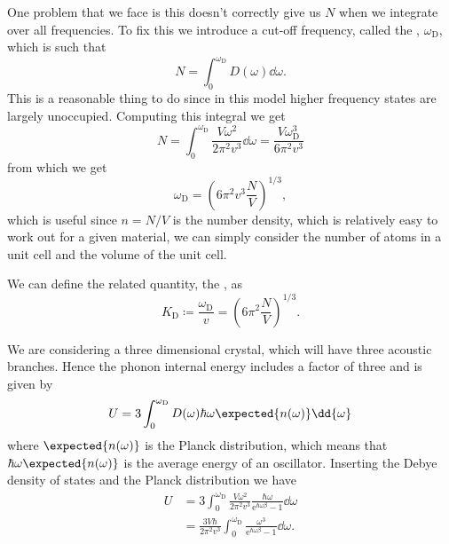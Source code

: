 \documentclass[fleqn]{NotesClass}
\newcommand*{\e}{\mathrm{e}}
\newcommand*{\debye}{\mathrm{D}}
\begin{document}
    One problem that we face is this doesn't correctly give us \(N\) when we integrate over all frequencies.
    To fix this we introduce a cut-off frequency, called the , \(\omega_{\debye}\), which is such that
    \begin{equation}
        N = \int_0^{\omega_{\debye}} D(\omega) \dd{\omega}.
    \end{equation}
    This is a reasonable thing to do since in this model higher frequency states are largely unoccupied.
    Computing this integral we get
    \begin{equation}
        N = \int_{0}^{\omega_{\debye}} \frac{V\omega^2}{2\pi^2v^3} \dd{\omega} = \frac{V\omega_{\debye}^{3}}{6\pi^2v^3}
    \end{equation}
    from which we get
    \begin{equation}
        \omega_{\debye} = \left(6\pi^2v^3 \frac{N}{V}\right)^{1/3},
    \end{equation}
    which is useful since \(n = N/V\) is the number density, which is relatively easy to work out for a given material, we can simply consider the number of atoms in a unit cell and the volume of the unit cell.
    
    We can define the related quantity, the , as
    \begin{equation}
        K_{\debye} \coloneqq \frac{\omega_{\debye}}{v} = \left( 6\pi^2\frac{N}{V} \right)^{1/3}.
    \end{equation}
    
    We are considering a three dimensional crystal, which will have three acoustic branches.
    Hence the phonon internal energy includes a factor of three and is given by
    \begin{equation}
        U = 3 \int_{0}^{\omega_{\debye}} D(\omega) \hbar\omega \expected{n(\omega)} \dd{\omega}
    \end{equation}
    where \(\expected{n(\omega)}\) is the Planck distribution, which means that \(\hbar\omega\expected{n(\omega)}\) is the average energy of an oscillator.
    Inserting the Debye density of states and the Planck distribution we have
    \begin{align}
        U &= 3\int_{0}^{\omega_{\debye}} \frac{V\omega^2}{2\pi^2v^3} \frac{\hbar\omega}{\e^{\hbar\omega\beta} - 1} \dd{\omega}\\
        &= \frac{3V\hbar}{2\pi^2v^3} \int_{0}^{\omega_{\debye}} \frac{\omega^3}{\e^{\hbar\omega\beta} - 1} \dd{\omega}.
    \end{align}
    
\end{document}
